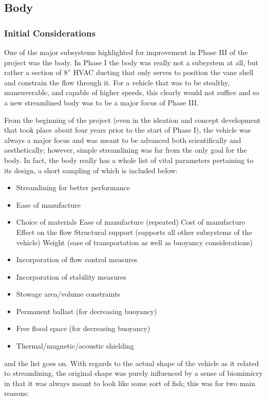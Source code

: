 \documentclass{report}
\begin{document}
\subsection{Body}
\subsubsection{Initial Considerations}
One of the major subsystems highlighted for improvement in Phase III of the project was the body.  In Phase I the body was really not a subsystem at all, but rather a section of 8” HVAC ducting that only serves to position the vane shell and constrain the flow through it.  For a vehicle that was to be stealthy, maneuverable, and capable of higher speeds, this clearly would not suffice and so a new streamlined body was to be a major focus of Phase III.\par
From the beginning of the project (even in the ideation and concept development that took place about four years prior to the start of Phase I), the vehicle was always a major focus and was meant to be advanced  both scientifically and aesthetically; however, simple streamlining was far from the only goal for the body.  In fact, the body really has a whole list of vital parameters pertaining to its design, a short sampling of which is included below:
\begin{itemize}
\item Streamlining for better performance
\item Ease of manufacture
\item Choice of materials
\subitem Ease of manufacture (repeated)
\subitem Cost of manufacture
\subitem Effect on the flow
\subitem Structural support (supports all other subsystems of the vehicle)
\subitem Weight (ease of transportation as well as buoyancy considerations)
\item Incorporation of flow control measures
\item Incorporation of stability measures
\item Stowage area/volume constraints
\item Permanent ballast (for decreasing buoyancy)
\item Free flood space (for decreasing buoyancy)
\item Thermal/magnetic/acoustic shielding
\end{itemize}
and the list goes on.
With regards to the actual shape of the vehicle as it related to streamlining, the original shape was purely influenced by a sense of biomimicry in that it was always meant to look like some sort of fish; this was for two main reasons:
\end{document}
